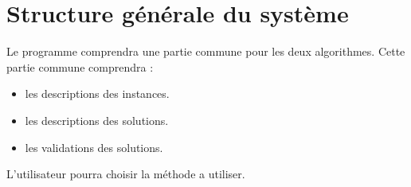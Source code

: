 \section{Structure générale du système}

Le programme comprendra une partie commune pour les deux algorithmes.
Cette partie commune comprendra :
\begin{itemize}
    \item les descriptions des instances.
    \item les descriptions des solutions.
    \item les validations des solutions.
\end{itemize}

L'utilisateur pourra choisir la méthode a utiliser.